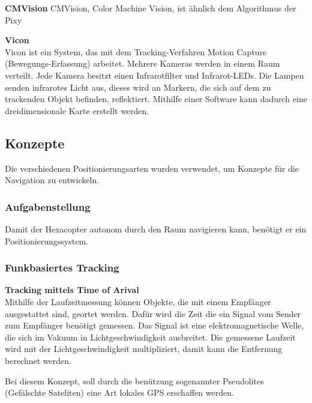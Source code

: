     \textbf{CMVision}
    CMVision, Color Machine Vision, ist ähnlich dem Algorithmus der Pixy

    \cite{Pixy}
    \cite{Pixy_Verfahren}
    \cite{Pixy_Verfahren2}

    \textbf{Vicon}\\
    Vicon ist ein System, das mit dem Tracking-Verfahren Motion Capture (Bewegungs-Erfassung) arbeitet.
    Mehrere Kameras werden in einem Raum verteilt. Jede Kamera besitzt einen Infrarotfilter und Infrarot-LEDs. Die Lampen senden infrarotes Licht aus, dieses wird an Markern, die sich auf dem zu trackenden Objekt befinden, reflektiert. Mithilfe einer Software kann dadurch eine dreidimensionale Karte erstellt werden.
    \cite{Vicon}

  \subsection{Konzepte}
  Die verschiedenen Positionierungsarten wurden verwendet, um Konzepte für die Navigation zu entwickeln.

    \subsubsection{Aufgabenstellung}
    Damit der Hexacopter autonom durch den Raum navigieren kann, benötigt er ein Positionierungssystem.

    \subsubsection{Funkbasiertes Tracking}

      \textbf{Tracking mittels Time of Arival}\\

      Mithilfe der Laufzeitmessung können Objekte, die mit einem Empfänger ausgestattet sind, geortet werden. Dafür wird die Zeit die ein Signal vom Sender zum Empfänger benötigt gemessen. Das Signal ist eine elektromagnetische Welle, die sich im Vakuum in Lichtgeschwindigkeit ausbreitet. Die gemessene Laufzeit wird mit der Lichtgeschwindigkeit multipliziert, damit kann die Entfernung berechnet werden.

      Bei diesem Konzept, soll durch die benützung sogenannter Pseudolites (Gefälschte Sateliten) eine Art lokales GPS erschaffen werden.

